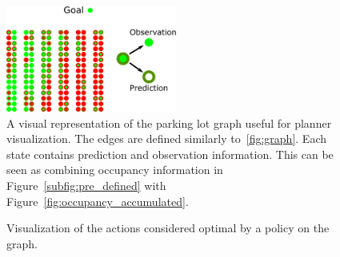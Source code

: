 \begin{figure}[t]
\begin{center}
\includegraphics[width=0.5\textwidth]{pictures/graph_observations.pdf}
\end{center}
\caption{A visual representation of the parking lot graph useful for planner visualization. The edges are defined similarly to~\ref{fig:graph}. Each state contains prediction and observation information. This can be seen as combining occupancy information in Figure~\ref{subfig:pre_defined} with Figure~\ref{fig:occupancy_accumulated}.}
\label{fig:graph_accumulated_illustration}
\end{figure}

\begin{figure}[b]%
\centering
{}\hspace{2mm}
\hspace{2mm}
\hspace{2mm}
\hspace{2mm}
\caption{Visualization of the actions considered optimal by a policy on the graph.}
\label{fig:actions}
\end{figure}

